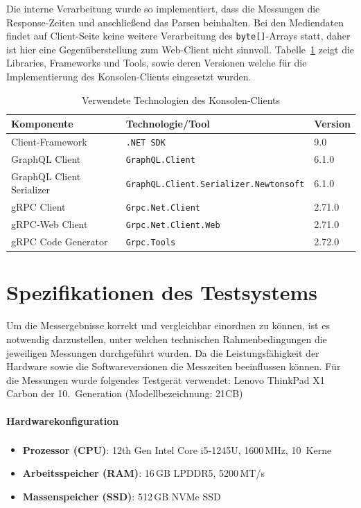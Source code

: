 \begin{enumerate}
	Die interne Verarbeitung wurde so implementiert, dass die Messungen die Response-Zeiten und anschließend das Parsen beinhalten.  
	Bei den Mediendaten findet auf Client-Seite keine weitere Verarbeitung des \texttt{byte[]}-Arrays statt, daher ist hier eine Gegenüberstellung zum Web-Client nicht sinnvoll.
	Tabelle~\ref{tab:console-tech} zeigt die Libraries, Frameworks und Tools, sowie deren Versionen welche für die Implementierung des Konsolen-Clients eingesetzt wurden.
	
	\begin{table}[h]
		\centering
		\caption{Verwendete Technologien des Konsolen-Clients}
		\label{tab:console-tech}
		\begin{tabular}{lll}
			\hline
			\textbf{Komponente} & \textbf{Technologie/Tool} & \textbf{Version} \\
			\hline
			Client-Framework & \texttt{.NET~SDK} & 9.0 \\
			GraphQL Client & \texttt{GraphQL.Client} & 6.1.0 \\
			GraphQL Client Serializer & \texttt{GraphQL.Client.Serializer.Newtonsoft} & 6.1.0 \\
			gRPC Client & \texttt{Grpc.Net.Client} & 2.71.0 \\
			gRPC-Web Client & \texttt{Grpc.Net.Client.Web} & 2.71.0 \\
			gRPC Code Generator & \texttt{Grpc.Tools} & 2.72.0 \\
			\hline
		\end{tabular}
	\end{table}
	
\end{enumerate}
\section{Spezifikationen des Testsystems}
Um die Messergebnisse korrekt und vergleichbar einordnen zu können, ist es notwendig darzustellen, unter welchen technischen Rahmenbedingungen die jeweiligen Messungen durchgeführt wurden. Da die Leistungsfähigkeit der Hardware sowie die Softwareversionen die Messzeiten beeinflussen können.
Für die Messungen wurde folgendes Testgerät verwendet:  
Lenovo ThinkPad X1 Carbon der 10.\ Generation (Modellbezeichnung: 21CB)
\paragraph{Hardwarekonfiguration}
\begin{itemize}
	\item \textbf{Prozessor (CPU)}: 12th Gen Intel\textsuperscript{\textregistered} Core\texttrademark{} i5-1245U, 1600\,MHz, 10~Kerne
	\item \textbf{Arbeitsspeicher (RAM)}: 16\,GB LPDDR5, 5200\,MT/s
	\item \textbf{Massenspeicher (SSD)}: 512\,GB NVMe SSD
\end{itemize}

